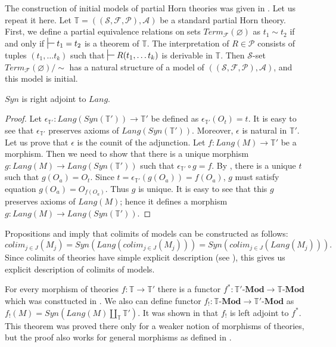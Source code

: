 \documentclass[reqno]{amsart}
\theoremstyle{definition}
\theoremstyle{remark}
\newcommand{\cat}[1]{\mathbf{#1}}
\newcommand{\Mod}[1]{#1\text{-}\cat{Mod}}
\numberwithin{figure}{section}
\begin{document}
The construction of initial models of partial Horn theories was given in \cite{PHL}.
Let us repeat it here.
Let $\mathbb{T} = ((\mathcal{S},\mathcal{F},\mathcal{P}),\mathcal{A})$ be a standard partial Horn theory.
First, we define a partial equivalence relations on sets $Term_\mathcal{F}(\varnothing)$ as $t_1 \sim t_2$ if and only if $\sststile{}{} t_1 = t_2$ is a theorem of $\mathbb{T}$.
The interpretation of $R \in \mathcal{P}$ consists of tuples $(t_1, \ldots t_k)$ such that $\sststile{}{} R(t_1, \ldots t_k)$ is derivable in $\mathbb{T}$.
Then $\mathcal{S}$-set $Term_\mathcal{F}(\varnothing)/\!\sim$ has a natural structure of a model of $((\mathcal{S},\mathcal{F},\mathcal{P}),\mathcal{A})$, and this model is initial.

\begin{prop}
$Syn$ is right adjoint to $Lang$.
\end{prop}
\begin{proof}
Let $\epsilon_{\mathbb{T}'} : Lang(Syn(\mathbb{T}')) \to \mathbb{T}'$ be defined as $\epsilon_{\mathbb{T}'}(O_t) = t$.
It is easy to see that $\epsilon_{\mathbb{T}'}$ preserves axioms of $Lang(Syn(\mathbb{T}'))$.
Moreover, $\epsilon$ is natural in $\mathbb{T}'$.
Let us prove that $\epsilon$ is the counit of the adjunction.
Let $f : Lang(M) \to \mathbb{T}'$ be a morphism.
Then we need to show that there is a unique morphism $g : Lang(M) \to Lang(Syn(\mathbb{T}'))$ such that $\epsilon_{\mathbb{T}'} \circ g = f$.
By , there is a unique $t$ such that $g(O_a) = O_t$.
Since $t = \epsilon_{\mathbb{T}'}(g(O_a)) = f(O_a)$, $g$ must satisfy equation $g(O_a) = O_{f(O_a)}$.
Thus $g$ is unique.
It is easy to see that this $g$ preserves axioms of $Lang(M)$; hence it defines a morphism $g : Lang(M) \to Lang(Syn(\mathbb{T}'))$.
\end{proof}

\begin{rem}[colimits]
Propositions  and  imply that colimits of models can be constructed as follows:
\[ colim_{j \in J}(M_j) = Syn(Lang(colim_{j \in J}(M_j))) = Syn(colim_{j \in J}(Lang(M_j))). \]
Since colimits of theories have simple explicit description (see \cite{alg-tt}), this gives us explicit description of colimits of models.
\end{rem}

For every morphism of theories $f : \mathbb{T} \to \mathbb{T}'$ there is a functor $f^* : \Mod{\mathbb{T}'} \to \Mod{\mathbb{T}}$ which was consttucted in \cite{alg-tt}.
We also can define functor $f_! : \Mod{\mathbb{T}} \to \Mod{\mathbb{T}'}$ as $f_!(M) = Syn(Lang(M) \amalg_{\mathbb{T}} \mathbb{T}')$.
It was shown in \cite{PHL} that $f_!$ is left adjoint to $f^*$.
This theorem was proved there only for a weaker notion of morphisms of theories, but the proof also works for general morphisms as defined in \cite{alg-tt}.
\end{document}
